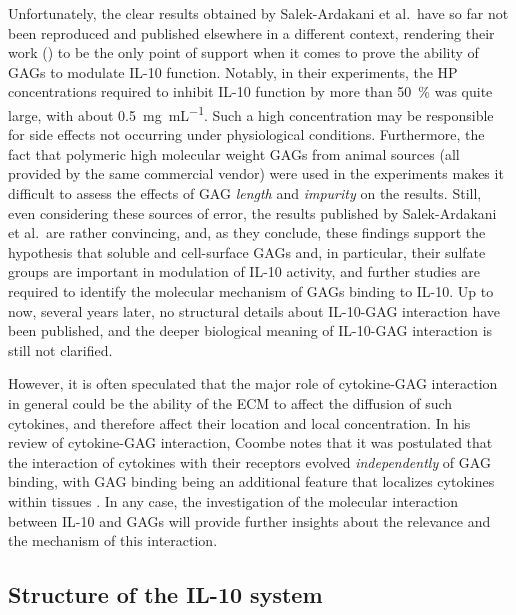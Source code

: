 Unfortunately, the clear results obtained by Salek-Ardakani et al.\ have so far
not been reproduced and published elsewhere in a different context, rendering
their work (\cite{salek_ardakani_2000}) to be the only point of support when it
comes to prove the ability of GAGs to modulate IL-10 function. Notably, in their
experiments, the HP concentrations required to inhibit IL-10 function by more
than \SI{50}{\percent} was quite large, with about
\SI{0.5}{\milli\gram\per\milli\liter}. Such a high concentration may be
responsible for side effects not occurring under physiological conditions.
Furthermore, the fact that polymeric high molecular weight GAGs from animal
sources (all provided by the same commercial vendor) were used in the
experiments makes it difficult to assess the effects of GAG \textit{length} and
\textit{impurity} on the results. Still, even considering these sources of
error, the results published by Salek-Ardakani et al.\ are rather convincing,
and, as they conclude, these findings support the hypothesis that soluble and
cell-surface GAGs and, in particular, their sulfate groups are important in
modulation of IL-10 activity, and further studies are required to identify the
molecular mechanism of GAGs binding to IL-10. Up to now, several years later, no
structural details about IL-10-GAG interaction have been published, and the
deeper biological meaning of IL-10-GAG interaction is still not clarified.

However, it is often speculated that the major role of cytokine-GAG interaction
in general could be the ability of the ECM to affect the diffusion of such
cytokines, and therefore affect their location and local concentration. In his
review of cytokine-GAG interaction, Coombe notes that it was postulated that the
interaction of cytokines with their receptors evolved \textit{independently} of
GAG binding, with GAG binding being an additional feature that localizes
cytokines within tissues \cite{coombe_cytokine_gag_2008}. In any case, the
investigation of the molecular interaction between IL-10 and GAGs will provide
further insights about the relevance and the mechanism of this interaction.


\subsection{Structure of the IL-10 system}
\label{background:structureil10system}

